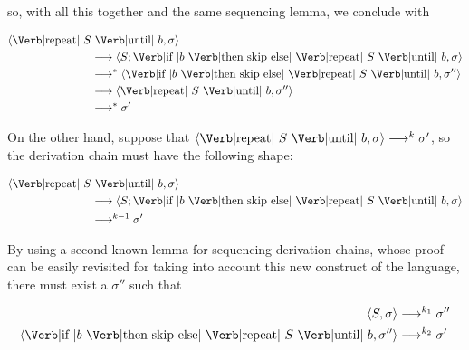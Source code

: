 \documentclass{article}
\begin{document}
\begin{enumerate}[2.]
    so, with all this together and the same sequencing lemma, 
    we conclude with

    \begin{align*}
      \langle
        \text{\Verb|repeat| } S &\text{ \Verb|until| } b,
        \sigma
      \rangle \\&\longrightarrow
      \langle
        S;
        \text{\Verb|if |} b \text{ \Verb|then skip else| } 
        \text{\Verb|repeat| } S \text{ \Verb|until| } b,
        \sigma
      \rangle \\&\longrightarrow^{*}
      \langle 
        \text{\Verb|if |} b \text{ \Verb|then skip else| } 
        \text{\Verb|repeat| } S \text{ \Verb|until| } b,
        \sigma''
      \rangle \\&\longrightarrow
      \langle 
        \text{\Verb|repeat| } S \text{ \Verb|until| } b,
        \sigma''
      \rangle \\&\longrightarrow^{*}
      \sigma'
    \end{align*}

    On the other hand, suppose that 
    $
      \langle 
        \text{\Verb|repeat| } S \text{ \Verb|until| } b,
        \sigma
      \rangle \longrightarrow^{k}
      \sigma'
    $, so the derivation chain must have the following shape:

    \begin{align*}
      \langle
        \text{\Verb|repeat| } S &\text{ \Verb|until| } b,
        \sigma
      \rangle \\&\longrightarrow
      \langle
        S;
        \text{\Verb|if |} b \text{ \Verb|then skip else| } 
        \text{\Verb|repeat| } S \text{ \Verb|until| } b,
        \sigma
      \rangle \\&\longrightarrow^{k - 1}
      \sigma'
    \end{align*}

    By using a second known lemma for sequencing derivation 
    chains, whose proof can be easily revisited for taking into 
    account this new construct of the language, there must 
    exist a $\sigma''$ such that 

    \begin{align*}
    \langle S, \sigma \rangle &\longrightarrow^{k_1} \sigma'' \\
    \langle 
        \text{\Verb|if |} b \text{ \Verb|then skip else| } 
        \text{\Verb|repeat| } S \text{ \Verb|until| } b,
        \sigma''
    \rangle &\longrightarrow^{k_2} \sigma'
    \end{align*}


\end{enumerate}
\end{document}
